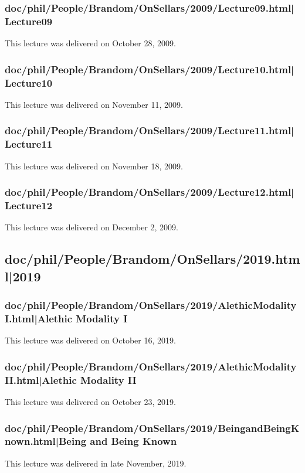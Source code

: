 \documentclass[12pt,a4paper]{report}
\begin{document}
\subsubsection{doc/phil/People/Brandom/OnSellars/2009/Lecture09.html|Lecture09}
This lecture was delivered on October 28, 2009.

\subsubsection{doc/phil/People/Brandom/OnSellars/2009/Lecture10.html|Lecture10}
This lecture was delivered on November 11, 2009.

\subsubsection{doc/phil/People/Brandom/OnSellars/2009/Lecture11.html|Lecture11}
This lecture was delivered on November 18, 2009.

\subsubsection{doc/phil/People/Brandom/OnSellars/2009/Lecture12.html|Lecture12}
This lecture was delivered on December 2, 2009.

\subsection{doc/phil/People/Brandom/OnSellars/2019.html|2019}

\subsubsection{doc/phil/People/Brandom/OnSellars/2019/AlethicModalityI.html|Alethic Modality I}
This lecture was delivered on October 16, 2019.

\subsubsection{doc/phil/People/Brandom/OnSellars/2019/AlethicModalityII.html|Alethic Modality II}
This lecture was delivered on October 23, 2019.

\subsubsection{doc/phil/People/Brandom/OnSellars/2019/BeingandBeingKnown.html|Being and Being Known}
This lecture was delivered in late November, 2019.
\end{document}
